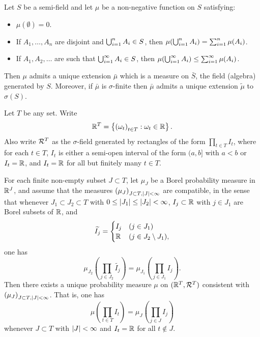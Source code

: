\documentclass[a4paper]{article}
\begin{document}
\begin{thm}
  Let $S$ be a semi-field and let $\mu$ be a non-negative function on $S$
  satisfying:
  \begin{itemize}
    \item $\mu (\emptyset) = 0$.
    \item If $A_1, \dots, A_n$ are disjoint and $\bigcup_{i=1}^n A_i \in S$, then
    $\mu (\bigcup_{i=1}^n A_i) = \sum_{i=1}^n \mu (A_i)$.
    \item If $A_1, A_2, \dots$ are such that $\bigcup_{i=1}^\infty A_i \in S$, then
    $\mu (\bigcup_{i=1}^\infty A_i) \leq \sum_{i=1}^\infty \mu (A_i)$.
  \end{itemize}
  Then $\mu$ admits a unique extension $\bar{\mu}$ which is a
  measure on $\bar{S}$, the field (algebra) generated by $S$. Moreover,
  if $\bar{\mu}$ is $\sigma$-finite then $\bar{\mu}$ admits a unique
  extension $\tilde{\mu}$ to $\sigma (S)$.
\end{thm}

\begin{notation}
  Let $T$ be any set. Write
  \[
  \mathbb{R}^T = \left\{ \left( \omega_t \right)_{t \in T} :
  \omega_t \in \mathbb{R} \right\}.
  \]
  Also write $\mathcal{R}^T$ as the $\sigma$-field generated by rectangles
  of the form $\prod_{t \in T} I_t$, where for each $t \in T$,
  $I_t$ is either a semi-open interval of the form $(a, b]$
  with $a < b$ or $I_t = \mathbb{R}$, and $I_t = \mathbb{R}$ for all but finitely
  many $t \in T$.
\end{notation}

\begin{thm}
  For each finite non-empty subset $J \subset T$,
  let $\mu_J$ be a Borel probability measure in $\mathbb{R}^J$,
  and assume that the measures $\left( \mu_J \right)_{J \subset T,
  \left\lvert J\right\rvert < \infty}$ are
  compatible, in the sense that whenever $J_1 \subset J_2 \subset T$
  with $0 \leq \left\lvert J_1\right\rvert \leq \left\lvert J_2\right\rvert < \infty$,
  $I_j \subset \mathbb{R}$ with $j \in J_1$ are Borel subsets of $\mathbb{R}$, and
  \[
  \widetilde{I_j} = \begin{cases}
    I_j & (j \in J_1) \\
    \mathbb{R} & (j \in J_2 \setminus J_1),
  \end{cases}
  \]
  one has
  \[
  \mu_{J_2} \left( \prod_{j \in J_2} \tilde{I_{j}} \right)
  = \mu_{J_1} \left( \prod_{j \in J_1} I_j \right).
  \]
  Then there exists a unique probability measure $\mu$ on
  $(\mathbb{R}^T, \mathcal{R}^T)$ consistent with $\left( \mu_J \right)_{J \subset T,
  \left\lvert J\right\rvert < \infty}$. That is, one has
  \[
  \mu \left( \prod_{t \in T} I_t \right)
  = \mu_J \left( \prod_{j \in J} I_j \right)
  \]
  whenever $J \subset T$ with $\left\lvert J\right\rvert < \infty$ and $I_t = \mathbb{R}$
  for all $t \notin J$.
\end{thm}
\end{document}
